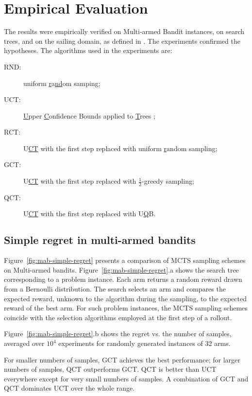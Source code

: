 \documentclass[letterpaper]{article}
\begin{document}
\section{Empirical Evaluation}
\label{sec:emp}

The results were empirically verified on Multi-armed Bandit instances,
on search trees, and on the sailing domain, as defined in \cite{Kocsis.uct}. The
experiments confirmed the hypotheses. The algorithms used in the
experiments are:
\begin{description}
\item[RND:] uniform \underline{r}a\underline{nd}om samping;
\item[UCT:] \underline{U}pper \underline{C}onfidence Bounds applied to
  \underline{T}rees \cite{Kocsis.uct};
\item[RCT:] U\underline{CT} with the first step replaced with uniform
  \underline{r}andom sampling;
\item[GCT:] U\underline{CT} with the first step
  replaced with $\frac 1 2$-\underline{g}reedy sampling;
\item[QCT:] U\underline{CT} with the first step
  replaced with U\underline{Q}B.
\end{description}

\subsection{Simple regret in multi-armed bandits}
\label{sec:emp-mab}

Figure~\ref{fig:mab-simple-regret} presents a comparison of MCTS sampling
schemes on Multi-armed bandits. Figure~\ref{fig:mab-simple-regret}.a shows the search tree
corresponding to a problem instance. Each arm returns a random reward
drawn from a Bernoulli distribution. The search selects an arm
and compares the expected reward, unknown to the algorithm during the
sampling, to the expected reward of the best arm. For such problem
instances, the MCTS sampling schemes coincide with the selection
algorithms employed at the first step of a rollout.

Figure~\ref{fig:mab-simple-regret}.b shows the regret
vs. the number of samples, averaged over $10^4$ experiments for
randomly generated instances of 32 arms. 

For smaller numbers of samples, GCT achieves the best
performance; for larger numbers of samples, QCT outperforms GCT. QCT is
better than UCT everywhere except for very small numbers of samples. A
combination of GCT and QCT dominates UCT over the whole range.
\end{document}
